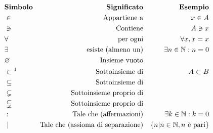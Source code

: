 
\begin{align*}
    &\textbf{Simbolo} &\textbf{Significato}                     &&\textbf{Esempio}\\
    &\in              &\text{Appartiene a}                      &&x \in A\\
    &\ni              &\text{Contiene}                          &&A \ni x\\
    &\forall          &\text{per ogni}                          &&\forall x, x = x\\
    &\exists          &\text{esiste (almeno un)}                &&\exists n\in\mathbb{N}: n = 0\\
    &\varnothing      &\text{Insieme vuoto}                     &&\\
    &\subset\text{\footnotemark} &\text{Sottoinsieme di}        && A \subset B\\
    &\subseteq        &\text{Sottoinsieme di}                   &&\\
    &\subsetneq       &\text{Sottoinsieme proprio di}           &&\\
    &\subsetneqq      &\text{Sottoinsieme proprio di}           &&\\
    &:                &\text{Tale che (affermazioni)}           && \exists k\in\mathbb{N}:k=0\\
    &\text{ }|        &\text{Tale che (assioma di separazione)} && \{n|n\in\mathbb{N}, n \text{ è pari}\}
\end{align*}

